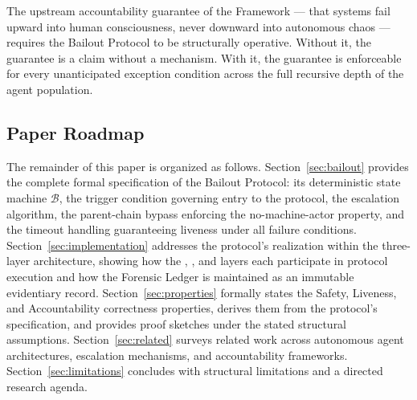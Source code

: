The upstream accountability guarantee of the \bxthree{} Framework --- that \bxthree{} systems fail upward into human consciousness, never downward into autonomous chaos --- requires the Bailout Protocol to be structurally operative. Without it, the guarantee is a claim without a mechanism. With it, the guarantee is enforceable for every unanticipated exception condition across the full recursive depth of the agent population.

\subsection{Paper Roadmap}

The remainder of this paper is organized as follows. Section~\ref{sec:bailout} provides the complete formal specification of the Bailout Protocol: its deterministic state machine $\mathcal{B}$, the trigger condition governing entry to the protocol, the escalation algorithm, the parent-chain bypass enforcing the no-machine-actor property, and the timeout handling guaranteeing liveness under all failure conditions. Section~\ref{sec:implementation} addresses the protocol's realization within the \bxthree{} three-layer architecture, showing how the \purpose{}, \bounds{}, and \fact{} layers each participate in protocol execution and how the Forensic Ledger is maintained as an immutable evidentiary record. Section~\ref{sec:properties} formally states the Safety, Liveness, and Accountability correctness properties, derives them from the protocol's specification, and provides proof sketches under the stated structural assumptions. Section~\ref{sec:related} surveys related work across autonomous agent architectures, escalation mechanisms, and accountability frameworks. Section~\ref{sec:limitations} concludes with structural limitations and a directed research agenda.
